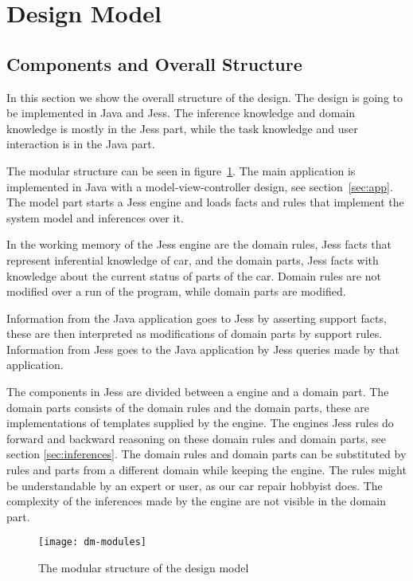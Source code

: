\section{Design Model}

\subsection{Components and Overall Structure}
\label{sec:components}

In this section we show the overall structure of the design. The design is going
to be implemented in Java and Jess. The inference knowledge and domain knowledge
is mostly in the Jess part, while the task knowledge and user interaction is in
the Java part.

The modular structure can be seen in figure~\ref{fig:dm:modules}. The main
application is implemented in Java with a model-view-controller design, see
section~\ref{sec:app}. The model part starts a Jess engine and loads facts and
rules that implement the system model and inferences over it.

In the working memory of the Jess engine are the domain rules, Jess facts
that represent inferential knowledge of car, and the domain parts, Jess facts
with knowledge about the current status of parts of the car.
Domain rules are not modified over a run of the program, while domain parts are modified. 

Information from the Java application goes to Jess by asserting support facts,
these are then interpreted as modifications of domain parts by support rules.
Information from Jess goes to the Java application by Jess queries made by that
application. 

The components in Jess are divided between a engine and a domain part. The
domain parts consists of the domain rules and the domain parts, these are implementations
of templates supplied by the engine. The engines Jess rules do forward and
backward reasoning on these domain rules and domain parts, see section \ref{sec:inferences}.
The domain rules and domain parts can be substituted by rules and parts from a
different domain while keeping the engine. The rules might be understandable by an
expert or user, as our car repair hobbyist does. The complexity of the inferences
made by the engine are not visible in the domain part.

\begin{figure}[htbp]
    \centering
    \texttt{[image: dm-modules]}
    \caption{The modular structure of the design model}
    \label{fig:dm:modules}
\end{figure}

